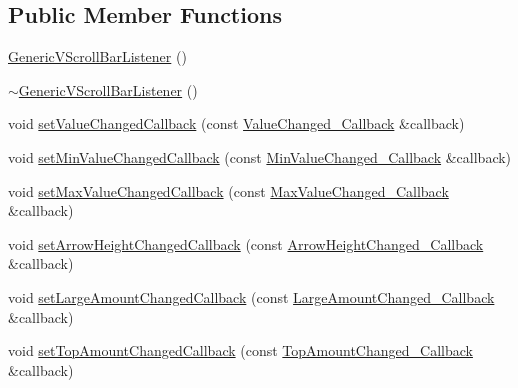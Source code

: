 \subsection*{Public Member Functions}
\begin{DoxyCompactItemize}
\item 
\mbox{\hyperlink{classec_1_1_generic_v_scroll_bar_listener_a33f0ddbaa19ba19516d888626de96983}{Generic\+V\+Scroll\+Bar\+Listener}} ()
\item 
\mbox{\hyperlink{classec_1_1_generic_v_scroll_bar_listener_a168c0a762469a14777eb77fcb42f0f88}{$\sim$\+Generic\+V\+Scroll\+Bar\+Listener}} ()
\item 
void \mbox{\hyperlink{classec_1_1_generic_v_scroll_bar_listener_a8bb959e995ce5e1c7655ca33d7878845}{set\+Value\+Changed\+Callback}} (const \mbox{\hyperlink{classec_1_1_generic_v_scroll_bar_listener_ae6332f8564b656388c34e02b9ee05575}{Value\+Changed\+\_\+\+Callback}} \&callback)
\item 
void \mbox{\hyperlink{classec_1_1_generic_v_scroll_bar_listener_a01a737439ecd2ea4eb06c9cd289aa818}{set\+Min\+Value\+Changed\+Callback}} (const \mbox{\hyperlink{classec_1_1_generic_v_scroll_bar_listener_ad88274a7e9cf15ea8ff56b5cffed71b2}{Min\+Value\+Changed\+\_\+\+Callback}} \&callback)
\item 
void \mbox{\hyperlink{classec_1_1_generic_v_scroll_bar_listener_a7970b714360ca10a9efe8f1a24c80098}{set\+Max\+Value\+Changed\+Callback}} (const \mbox{\hyperlink{classec_1_1_generic_v_scroll_bar_listener_a21e91025da3eebfc5da4b7489869183a}{Max\+Value\+Changed\+\_\+\+Callback}} \&callback)
\item 
void \mbox{\hyperlink{classec_1_1_generic_v_scroll_bar_listener_ae1a070c77bbada0f10affdeba2d658f6}{set\+Arrow\+Height\+Changed\+Callback}} (const \mbox{\hyperlink{classec_1_1_generic_v_scroll_bar_listener_ac1f858278a1e02d55a109fcf9939932c}{Arrow\+Height\+Changed\+\_\+\+Callback}} \&callback)
\item 
void \mbox{\hyperlink{classec_1_1_generic_v_scroll_bar_listener_a0f8b64bbe3300f3c609c5b59beccca4a}{set\+Large\+Amount\+Changed\+Callback}} (const \mbox{\hyperlink{classec_1_1_generic_v_scroll_bar_listener_ad3ca6f0d2092abe22a26f20e821c35b6}{Large\+Amount\+Changed\+\_\+\+Callback}} \&callback)
\item 
void \mbox{\hyperlink{classec_1_1_generic_v_scroll_bar_listener_ae6da4d146c94fff957d01206d6ebb99d}{set\+Top\+Amount\+Changed\+Callback}} (const \mbox{\hyperlink{classec_1_1_generic_v_scroll_bar_listener_af8bcd97ac937ea6fb151d93a419cd3a2}{Top\+Amount\+Changed\+\_\+\+Callback}} \&callback)

\end{DoxyCompactItemize}

